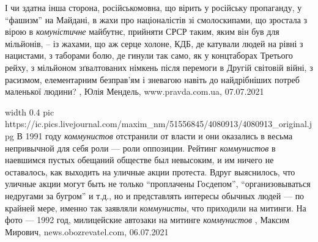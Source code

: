 І чи здатна інша сторона, російськомовна, що вірить у російську пропаганду, у
\enquote{фашизм} на Майдані, в жахи про націоналістів зі смолоскипами, що зростала з
вірою в \emph{комуністичне} майбутнє, прийняти СРСР таким, яким він був для мільйонів,
– із жахами, що аж серце холоне, КДБ, де катували людей на рівні з нацистами, з
таборами болю, де гинули так само, як у концтаборах Третього рейху, з мільйоном
зґвалтованих німкень після перемоги в Другій світовій війні, з расизмом,
елементарним безправ’ям і зневагою навіть до найдрібніших потреб маленької
людини? 
, 
Юлія Мендель, www.pravda.com.ua, 07.07.2021

\ifcmt
	width 0.4
  pic https://ic.pics.livejournal.com/maxim_nm/51556845/4080913/4080913_original.jpg
\fi
В 1991 году \emph{коммунистов} отстранили от власти и они оказались в весьма
непривычной для себя роли — роли оппозиции. Рейтинг \emph{коммунистов} в наевшимся
пустых обещаний обществе был невысоким, и им ничего не оставалось, как выходить
на уличные акции протеста. Вдруг выяснилось, что уличные акции могут быть не
только \enquote{проплачены Госдепом}, \enquote{организовываться недругами за бугром} и т.д., но
и представлять интересы обычных людей — по крайней мере, именно так заявляли
\emph{коммунисты}, что приходили на митинги. На фото — 1992 год, милицейские автозаки
на митинге \emph{коммунистов}
, Максим Мирович, news.obozrevatel.com, 06.07.2021

